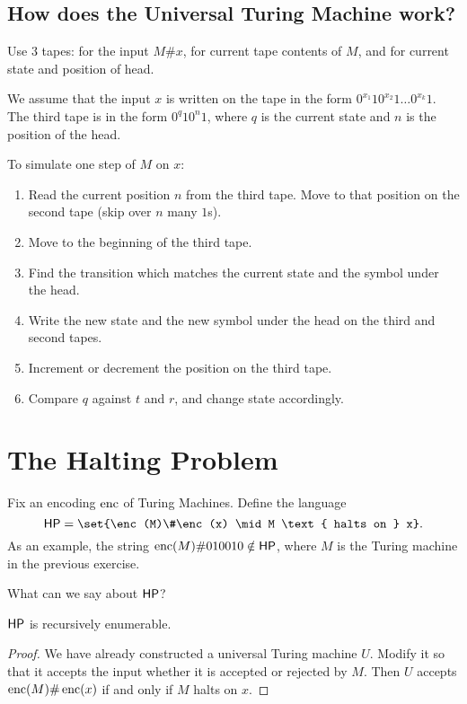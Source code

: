 \subsection{How does the Universal Turing Machine work?}
\label{sec:utm:working}
Use $3$ tapes: for the input $M\#x$, for current tape contents of $M$,
and for current state and position of head.

We assume that the input $x$ is written on the tape in the form
$0^{x_1} 1 0^{x_2} 1 \dots 0^{x_k} 1$.
The third tape is in the form $0^q 1 0^n 1$, where $q$ is the current state
and $n$ is the position of the head.

To simulate one step of $M$ on $x$:
\begin{enumerate}
    \item Read the current position $n$ from the third tape.
    Move to that position on the second tape (skip over $n$ many $1$s).
    \item Move to the beginning of the third tape.
    \item Find the transition which matches the current state and the symbol
    under the head.
    \item Write the new state and the new symbol under the head
    on the third and second tapes.
    \item Increment or decrement the position on the third tape.
    \item Compare $q$ against $t$ and $r$, and change state accordingly.
\end{enumerate}

\section{The Halting Problem} \label{sec:hp}
Fix an encoding $\operatorname{enc}$ of Turing Machines.
Define the language \[
    \HP = \set{\enc(M)\#\enc(x) \mid M \text{ halts on } x}.
\] As an example, the string $\operatorname{enc}(M)\#010010 \notin \mathsf{HP}$, where $M$ is the
Turing machine in the previous exercise.

What can we say about $\mathsf{HP}$?
\begin{theorem}
    $\mathsf{HP}$ is recursively enumerable.
\end{theorem}
\begin{proof}
    We have already constructed a universal Turing machine $U$.
    Modify it so that it accepts the input whether it is accepted or
    rejected by $M$.
    Then $U$ accepts $\operatorname{enc}(M)\#\operatorname{enc}(x)$ if and only if $M$ halts on $x$.
\end{proof}

